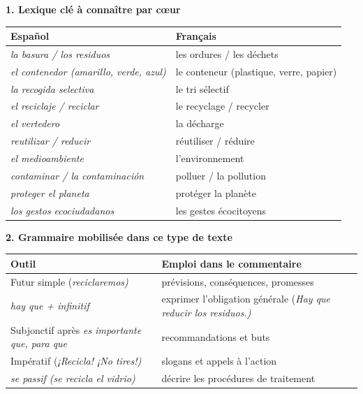 \documentclass[11pt]{article}
\newcommand{\esp}[1]{\ifmmode\text{\textit{#1}}\else\begingroup\selectlanguage{spanish}\itshape #1\endgroup\fi}
\begin{document}
\begin{bilan}
\textbf{1. Lexique clé à connaître par cœur}
\begin{center}
\begin{tabularx}{\linewidth}{|X|X|}\hline
\rowcolor{popblueL} \textbf{Español} & \textbf{Français} \\ \hline
\esp{la basura / los residuos} & les ordures / les déchets \\ \hline
\esp{el contenedor (amarillo, verde, azul)} & le conteneur (plastique, verre, papier) \\ \hline
\esp{la recogida selectiva} & le tri sélectif \\ \hline
\esp{el reciclaje / reciclar} & le recyclage / recycler \\ \hline
\esp{el vertedero} & la décharge \\ \hline
\esp{reutilizar / reducir} & réutiliser / réduire \\ \hline
\esp{el medioambiente} & l'environnement \\ \hline
\esp{contaminar / la contaminación} & polluer / la pollution \\ \hline
\esp{proteger el planeta} & protéger la planète \\ \hline
\esp{los gestos ecociudadanos} & les gestes écocitoyens \\ \hline
\end{tabularx}
\end{center}

\textbf{2. Grammaire mobilisée dans ce type de texte}
\begin{center}
\begin{tabularx}{\linewidth}{|X|X|}\hline
\rowcolor{popgreenL} \textbf{Outil} & \textbf{Emploi dans le commentaire} \\ \hline
Futur simple (\esp{reciclaremos}) & prévisions, conséquences, promesses \\ \hline
\esp{hay que} + infinitif & exprimer l'obligation générale (\esp{Hay que reducir los residuos.}) \\ \hline
Subjonctif après \esp{es importante que, para que} & recommandations et buts \\ \hline
Impératif (\esp{¡Recicla! ¡No tires!}) & slogans et appels à l'action \\ \hline
\esp{se} passif (\esp{se recicla el vidrio}) & décrire les procédures de traitement \\ \hline
\end{tabularx}
\end{center}


\end{bilan}
\end{document}
